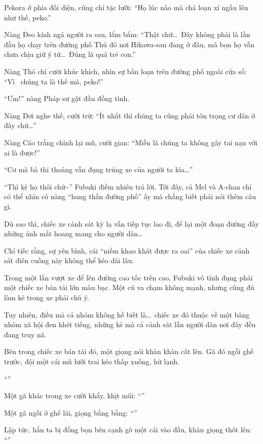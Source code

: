 \documentclass[../main.tex]{subfiles}
\begin{document}
Pekora ở phía đối diện, cũng chỉ tặc lưỡi: ``Họ lúc nào mà chả loạn xí ngầu lên như thế, peko.''

Nàng Đeo kính ngả người ra sau, lẩm bẩm: ``Thật chứ\dots\ Đây không phải là lần đầu họ chạy trên đường phố Thủ đô nơi Hikawa-san đang ở đâu, mà bọn họ vẫn chưa chịu giữ ý tứ\dots\ Đúng là quá trẻ con.''

Nàng Thỏ chỉ cười khúc khích, nhìn sự bấn loạn trên đường phố ngoài cửa sổ: ``Vì \hll\ chúng ta là thế mà, peko!''

``Ưm!'' nàng Pháp sư gật đầu đồng tình.

Nàng Dơi nghe thế, cười trừ: ``Ít nhất thì chúng ta cũng phải tôn trọng cư dân ở đây chứ\dots''

Nàng Cáo trắng chỉnh lại mũ, cười gian: ``Miễn là chúng ta không gây tai nạn với ai là được!''

``Cơ mà bà thi thoảng vẫn đụng trúng xe của người ta kìa\dots''

``Thì kệ họ thôi chứ\~{}'' Fubuki điềm nhiên trả lời. Tới đây, cả Mel và A-chan chỉ có thể nhìn cô nàng ``hung thần đường phố'' ấy mà chẳng biết phải nói thêm câu gì.

Dù sao thì, chiếc xe cảnh sát kỳ lạ vẫn tiếp tục lao đi, để lại một đoạn đường đầy những ánh mắt hoang mang cho người dân\dots

Chỉ tiếc rằng, sự yên bình, cái ``niềm khao khát được ra oai'' của chiếc xe cảnh sát điên cuồng này không thể kéo dài lâu.

Trong một lần vượt xe để lên đường cao tốc trên cao, Fubuki vô tình đụng phải một chiếc xe bán tải lớn màu bạc. Một cú va chạm không mạnh, nhưng cũng đủ làm kẻ trong xe phải chú ý.

Tuy nhiên, điều mà cả nhóm không hề biết là\dots\ chiếc xe đó thuộc về một băng nhóm xã hội đen khét tiếng, những kẻ mà cả cảnh sát lẫn người dân nơi đây đều đang truy nã.

Bên trong chiếc xe bán tải đó, một giọng nói khàn khàn cất lên. Gã đó ngồi ghế trước, đội một cái mũ lưỡi trai kéo thấp xuống, hừ lạnh.

``''

Một gã khác trong xe cười khẩy, khịt mũi: ``''

Một gã ngồi ở ghế lái, giọng bằng bằng: ``''

Lập tức, hắn ta bị đồng bọn bên cạnh gõ một cái vào đầu, khàn giọng thốt lên: ``''
\end{document}
